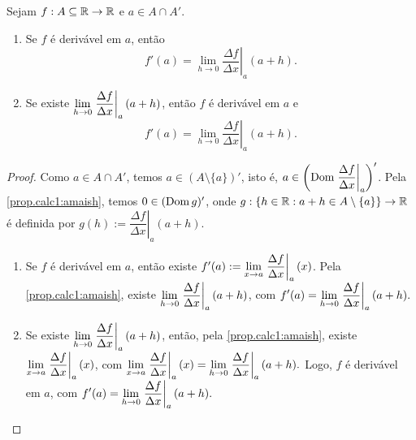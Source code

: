 \begin{proposition}
    Sejam $f : A \subseteq \mathbb{R} \to \mathbb{R}$ e $a \in A \cap A'$.
        \begin{enumerate}[leftmargin=*, align=left, label=\textbf{(\alph*)}]
            \item Se $f$ é derivável em $a$, então
                \[
                    f'(a) = \lim_{h \to 0} \left. \dfrac{\Delta f}{\Delta x} \right|_a (a+h).
                \]
            \item Se existe $\displaystyle \lim_{h \to 0} \left. \dfrac{\Delta f}{\Delta x} \right|_a (a+h)$, então $f$ é derivável em $a$ e
                \[
                    f'(a) = \lim_{h \to 0} \left. \dfrac{\Delta f}{\Delta x} \right|_a (a+h).
                \]
        \end{enumerate}
\end{proposition}

\begin{proof}
    Como $a \in A \cap A'$, temos $a \in (A \setminus \{a\})'$, isto é, $a \in \left(\operatorname{Dom} \left. \dfrac{\Delta f}{\Delta x} \right|_a \right)'$. Pela \cref{prop.calc1:amaish}, temos $0 \in (\operatorname{Dom} g)'$, onde $g : \{h \in \mathbb{R} : a+h \in A \setminus \{a\} \} \to \mathbb{R}$ é definida por $g(h) := \left. \dfrac{\Delta f}{\Delta x} \right|_a (a+h)$. 
        \begin{enumerate}[leftmargin=*, align=left, label=\textbf{(\alph*)}]
            \item Se $f$ é derivável em $a$, então existe $f'(a) := \displaystyle \lim_{x \to a} \left. \dfrac{\Delta f}{\Delta x} \right|_a (x)$. Pela \cref{prop.calc1:amaish}, existe $\displaystyle \lim_{h \to 0} \left. \dfrac{\Delta f}{\Delta x} \right|_a (a+h)$, com
                $ \displaystyle
                    f'(a) = \lim_{h \to 0} \left. \dfrac{\Delta f}{\Delta x} \right|_a (a+h).
                $
            \blackproof
            \item Se existe $\displaystyle \lim_{h \to 0} \left. \dfrac{\Delta f}{\Delta x} \right|_a (a+h)$, então, pela \cref{prop.calc1:amaish}, existe $\displaystyle \lim_{x \to a} \left. \dfrac{\Delta f}{\Delta x} \right|_a (x)$, com
                $ \displaystyle
                    \lim_{x \to a} \left. \dfrac{\Delta f}{\Delta x} \right|_a (x) = \lim_{h \to 0} \left. \dfrac{\Delta f}{\Delta x} \right|_a (a+h).
                $
            Logo, $f$ é derivável em $a$, com
                $ \displaystyle
                    f'(a) = \lim_{h \to 0} \left. \dfrac{\Delta f}{\Delta x} \right|_a (a+h).
                $
            \blackproof
        \end{enumerate}
\end{proof}

